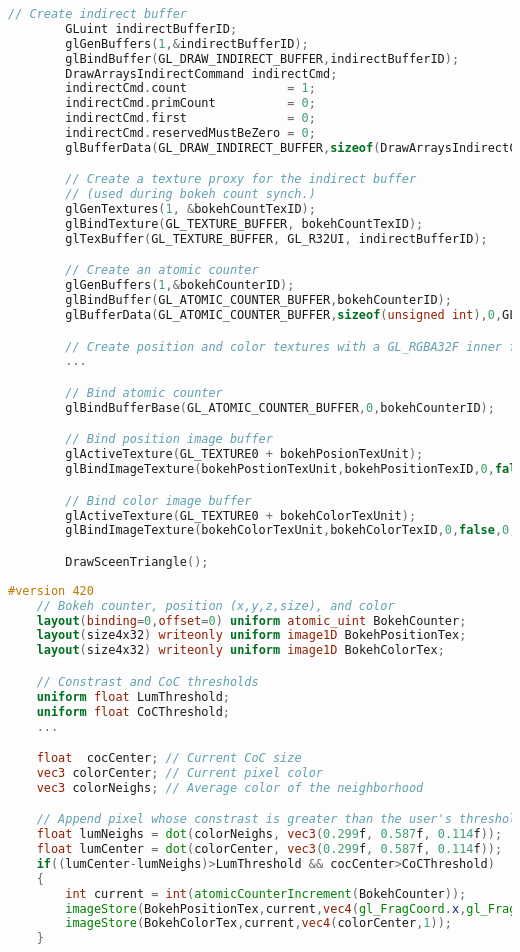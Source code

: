 \begin{lstlisting}[language=C++,float={htb},caption={Host application for extracting \bokehs \emph{(Pass 2)}.},label={Derousiers:bokehextractioncpp}]
		// Create indirect buffer
		GLuint indirectBufferID;
		glGenBuffers(1,&indirectBufferID);
		glBindBuffer(GL_DRAW_INDIRECT_BUFFER,indirectBufferID);
		DrawArraysIndirectCommand indirectCmd;
		indirectCmd.count              = 1;
		indirectCmd.primCount          = 0;
		indirectCmd.first              = 0;
		indirectCmd.reservedMustBeZero = 0;
		glBufferData(GL_DRAW_INDIRECT_BUFFER,sizeof(DrawArraysIndirectCommand),&indirecCmd,GL_DYNAMIC_DRAW);

		// Create a texture proxy for the indirect buffer 
		// (used during bokeh count synch.)
		glGenTextures(1, &bokehCountTexID);
		glBindTexture(GL_TEXTURE_BUFFER, bokehCountTexID);
		glTexBuffer(GL_TEXTURE_BUFFER, GL_R32UI, indirectBufferID);

		// Create an atomic counter
		glGenBuffers(1,&bokehCounterID);
		glBindBuffer(GL_ATOMIC_COUNTER_BUFFER,bokehCounterID);
		glBufferData(GL_ATOMIC_COUNTER_BUFFER,sizeof(unsigned int),0,GL_DYNAMIC_DRAW);

		// Create position and color textures with a GL_RGBA32F inner format
		...

		// Bind atomic counter
		glBindBufferBase(GL_ATOMIC_COUNTER_BUFFER,0,bokehCounterID);

		// Bind position image buffer
		glActiveTexture(GL_TEXTURE0 + bokehPosionTexUnit);
		glBindImageTexture(bokehPostionTexUnit,bokehPositionTexID,0,false,0,GL_WRITE_ONLY,GL_RGBA32F);

		// Bind color image buffer
		glActiveTexture(GL_TEXTURE0 + bokehColorTexUnit);
		glBindImageTexture(bokehColorTexUnit,bokehColorTexID,0,false,0,GL_WRITE_ONLY,GL_RGBA32F);

		DrawSceenTriangle();
\end{lstlisting}


\begin{lstlisting}[language=GLSL,float={htb},caption={Fragment shader for extracting \bokehs \emph{(Pass 2)}.},label={Derousiers:bokehextractionfs}]	
	#version 420
	// Bokeh counter, position (x,y,z,size), and color
	layout(binding=0,offset=0) uniform atomic_uint BokehCounter;
	layout(size4x32) writeonly uniform image1D BokehPositionTex;
	layout(size4x32) writeonly uniform image1D BokehColorTex;

	// Constrast and CoC thresholds
	uniform float LumThreshold;
	uniform float CoCThreshold;
	...

	float  cocCenter; // Current CoC size
	vec3 colorCenter; // Current pixel color
	vec3 colorNeighs; // Average color of the neighborhood

	// Append pixel whose constrast is greater than the user's threshold
	float lumNeighs = dot(colorNeighs, vec3(0.299f, 0.587f, 0.114f));
	float lumCenter = dot(colorCenter, vec3(0.299f, 0.587f, 0.114f));
	if((lumCenter-lumNeighs)>LumThreshold && cocCenter>CoCThreshold)
	{
		int current = int(atomicCounterIncrement(BokehCounter));
		imageStore(BokehPositionTex,current,vec4(gl_FragCoord.x,gl_FragCoord.y,depth,cocCenter));
		imageStore(BokehColorTex,current,vec4(colorCenter,1));
	}
\end{lstlisting}

